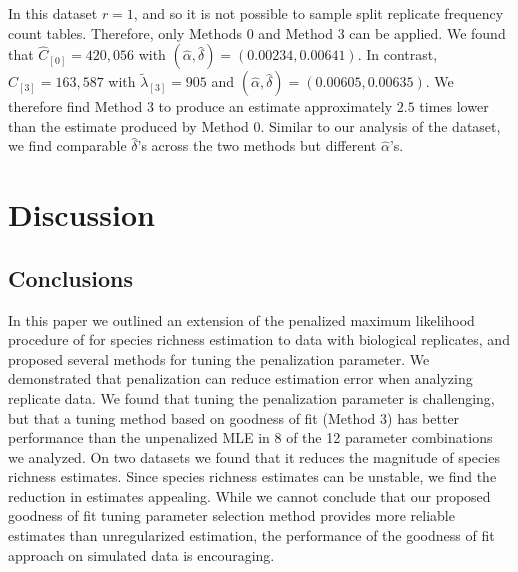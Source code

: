 \documentclass[12pt]{article}
\newcommand{\lambdagrid}{\lambda^{\text{grid}}}
\begin{document}
In this dataset $r=1$, and so it is not possible to sample split replicate frequency count tables. Therefore, only Methods 0 and Method 3 can be applied. We found that $\widehat{C}_{[0]} = 420,056$ with $(\hat{\alpha}, \hat{\delta}) = (0.00234, 0.00641).$ In contrast, $\widehat{C}_{[3]} = 163,587$ with $\tilde{\lambda}_{[3]} = 905$ and  $(\hat{\alpha}, \hat{\delta}) = (0.00605, 0.00635).$
We therefore find Method 3 to produce an estimate approximately $2.5$ times lower than the estimate produced by Method 0. Similar to our analysis of the \cite{tromas_2017} dataset, we find comparable $\hat{\delta}$'s across the two methods but different $\hat{\alpha}$'s.

\section{Discussion}

\label{sec:discussion}

\subsection{Conclusions}

In this paper we outlined an extension of the penalized maximum likelihood procedure of \citet{wang_2005} for species richness estimation to data with biological replicates, and proposed several methods for tuning the penalization parameter.  We demonstrated that penalization can reduce estimation error when analyzing replicate data.
We found that tuning the penalization parameter is challenging, but that a tuning method based on goodness of fit (Method 3) has better performance than the unpenalized MLE in 8 of the 12 parameter combinations we analyzed. On two datasets we found that it reduces the magnitude of species richness estimates. Since species richness estimates can be unstable, we find the reduction in estimates appealing. While we cannot conclude that our proposed goodness of fit tuning parameter selection method provides more reliable estimates than unregularized estimation, the performance of the goodness of fit approach on simulated data is encouraging.
\end{document}
